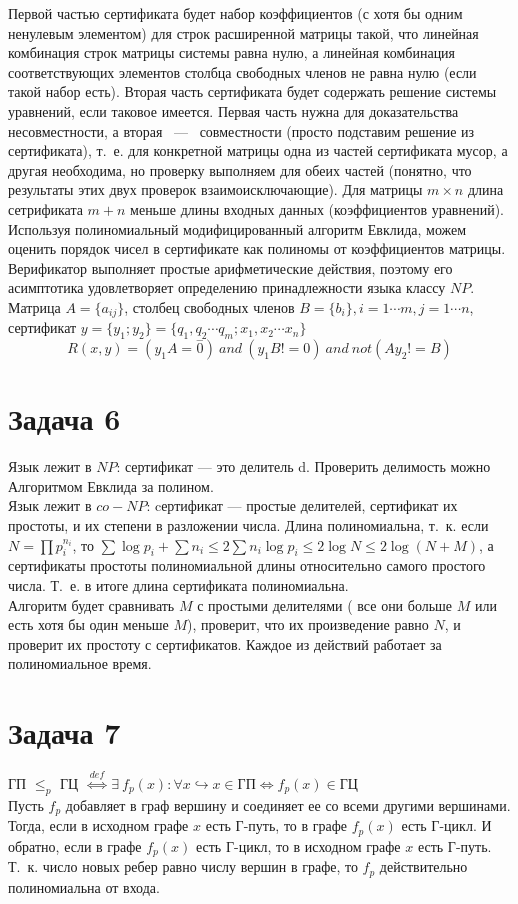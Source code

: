 \documentclass[a4paper,12pt]{article} %
\begin{document}
\noindent Первой частью сертификата будет набор коэффициентов (с хотя бы одним ненулевым элементом) для строк расширенной матрицы такой, что линейная комбинация строк матрицы системы равна нулю, а линейная комбинация соответствующих элементов столбца свободных членов не равна нулю (если такой набор есть). Вторая часть сертификата будет содержать решение системы уравнений, если таковое имеется. Первая часть нужна для доказательства  несовместности, а вторая ~---~ совместности (просто подставим решение из сертификата), т.~е. для конкретной матрицы одна из частей сертификата мусор, а другая необходима, но проверку выполняем для обеих частей (понятно, что результаты этих двух проверок взаимоисключающие). Для матрицы $m \times n$  длина сетрификата $m+n$ меньше длины входных данных (коэффициентов уравнений). Используя полиномиальный модифицированный алгоритм Евклида, можем оценить порядок чисел в сертификате как полиномы от коэффициентов матрицы.   
Верификатор выполняет простые арифметические действия, поэтому его асимптотика удовлетворяет определению принадлежности языка классу $NP$.\\

\noindent Матрица $ A=\{a_{ij}\text{\}}$, столбец свободных членов $B = \{b_i\},i={1\cdots m}, j=1\cdots n$, сертификат $y = \{y_1;y_2\}=\{q_1, q_2 \cdots q_m; x_1, x_2 \cdots x_n\}$
\[
R(x,y) = (y_1A = \overset{-}0)~ and~ (y_1B  != 0)~ and~ not(Ay_2 != B)
\] 

\section*{Задача 6}
Язык лежит в $NP$: сертификат — это делитель d. Проверить делимость можно
Алгоритмом Евклида за полином.\\
Язык лежит в $co-NP$: cертификат — простые делителей, сертификат их простоты, и их степени в разложении числа. Длина полиномиальна, т.~к. если $N = \prod{p_i^{n_i}}$, то $\sum{\log{p_i}}+\sum{n_i} \leq 2\sum{n_i\log{p_i}} \leq 2\log{N} \leq 2\log{(N+M)}$, а сертификаты простоты полиномиальной длины относительно самого простого числа. Т.~е. в итоге длина сертификата полиномиальна.\\
Алгоритм будет сравнивать $M$ с простыми делителями ( все они больше $M$ или есть хотя бы один меньше $M$), проверит, что их произведение равно $N$,
и проверит их простоту с сертификатов. Каждое из действий
работает за полиномиальное время.\\

\section*{Задача 7}
ГП $\leq _p$ ГЦ $~\overset{def}\Leftrightarrow~ \exists ~f_p(x): \forall x \hookrightarrow x \in \text{ГП} \Leftrightarrow f_p(x) \in \text{ГЦ}$\\
Пусть $f_p$ добавляет в граф вершину и соединяет ее со всеми другими вершинами. Тогда, если в исходном графе $x$ есть Г-путь, то в графе $f_p(x)$ есть Г-цикл. И обратно, если в графе $f_p(x)$ есть Г-цикл, то в исходном графе $x$ есть Г-путь. Т.~к. число новых ребер равно числу вершин в графе, то $f_p$ действительно полиномиальна от входа.\\
\end{document}
